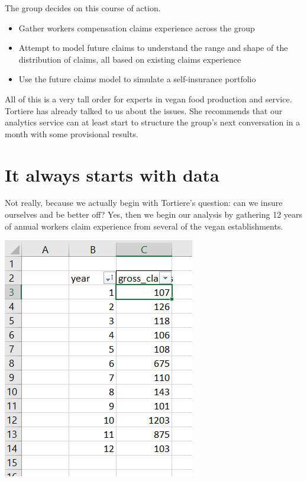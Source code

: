 \documentclass[
]{book}
\begin{document}
The group decides on this course of action.

\begin{itemize}
\item
  Gather workers compensation claims experience across the group
\item
  Attempt to model future claims to understand the range and shape of the distribution of claims, all based on existing claims experience
\item
  Use the future claims model to simulate a self-insurance portfolio
\end{itemize}

All of this is a very tall order for experts in vegan food production and service. Tortiere has already talked to us about the issues. She recommends that our analytics service can at least start to structure the group's next conversation in a month with some provisional results.

\hypertarget{it-always-starts-with-data}{%
\section{It always starts with data}\label{it-always-starts-with-data}}

Not really, because we actually begin with Tortiere's question: can we insure ourselves and be better off? Yes, then we begin our analysis by gathering 12 years of annual workers claim experience from several of the vegan establishments.

\includegraphics{images/06/claims-data.jpg}
\end{document}
